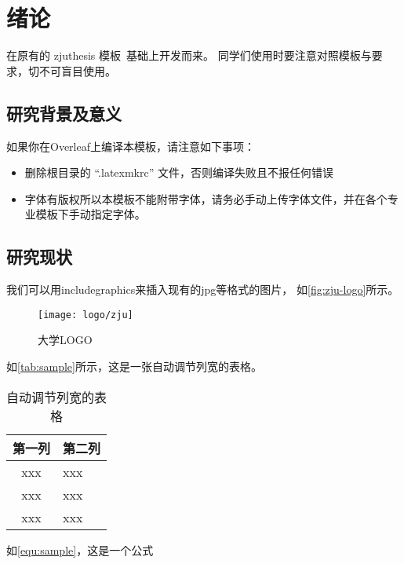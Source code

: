 \chapter{绪论}
在原有的 zjuthesis 模板~\cite{zjuthesis}基础上开发而来。
同学们使用时要注意对照模板与要求，切不可盲目使用。

\section{研究背景及意义}

如果你在Overleaf上编译本模板，请注意如下事项：

\begin{itemize}
    \item 删除根目录的 ``.latexmkrc'' 文件，否则编译失败且不报任何错误
    \item 字体有版权所以本模板不能附带字体，请务必手动上传字体文件，并在各个专业模板下手动指定字体。
        
\end{itemize}


\section{研究现状}

我们可以用includegraphics来插入现有的jpg等格式的图片，
如\autoref{fig:zju-logo}所示。

\begin{figure}[htbp]
    \centering
    \texttt{[image: logo/zju]}
    \caption{\label{fig:zju-logo}大学LOGO}

\end{figure}

\par 如\autoref{tab:sample}所示，这是一张自动调节列宽的表格。

\begin{table}[htbp]
    \caption{\label{tab:sample}自动调节列宽的表格}
    \begin{tabularx}{\linewidth}{c|X<{\centering}}
        \hline
        第一列 & 第二列 \\ \hline
        xxx & xxx \\ \hline
        xxx & xxx \\ \hline
        xxx & xxx \\ \hline
    \end{tabularx}
\end{table}


\par 如\autoref{equ:sample}，这是一个公式

